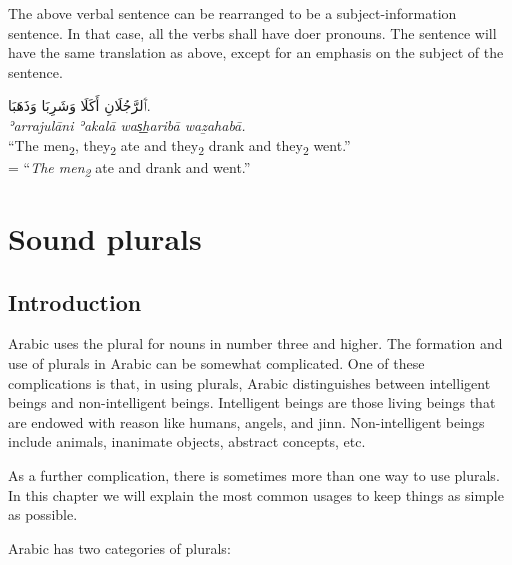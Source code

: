 \documentclass[
  10pt,
]{book}
\begin{document}
The above verbal sentence can be rearranged to be a subject-information sentence. In that case, all the verbs shall have doer pronouns. The sentence will have the same translation as above, except for an emphasis on the subject of the sentence.

\foreignlanguage{arabic}{ٱَلرَّجُلَانِ أَکَلَا وَشَرِبَا وَذَهَبَا.}\\
\emph{ʾarrajulāni ʾakalā was͟haribā waẕahabā.}\\
\enquote{The men\textsubscript{2}, they\textsubscript{2} ate and they\textsubscript{2} drank and they\textsubscript{2} went.}\\
= \enquote{\emph{The men\textsubscript{2}} ate and drank and went.}

\chapter{Sound plurals}\label{sound-plurals}

\section{Introduction}\label{introduction-8}

Arabic uses the plural for nouns in number three and higher. The formation and use of plurals in Arabic can be somewhat complicated. One of these complications is that, in using plurals, Arabic distinguishes between intelligent beings and non-intelligent beings. Intelligent beings are those living beings that are endowed with reason like humans, angels, and jinn. Non-intelligent beings include animals, inanimate objects, abstract concepts, etc.

As a further complication, there is sometimes more than one way to use plurals. In this chapter we will explain the most common usages to keep things as simple as possible.

Arabic has two categories of plurals:
\end{document}
